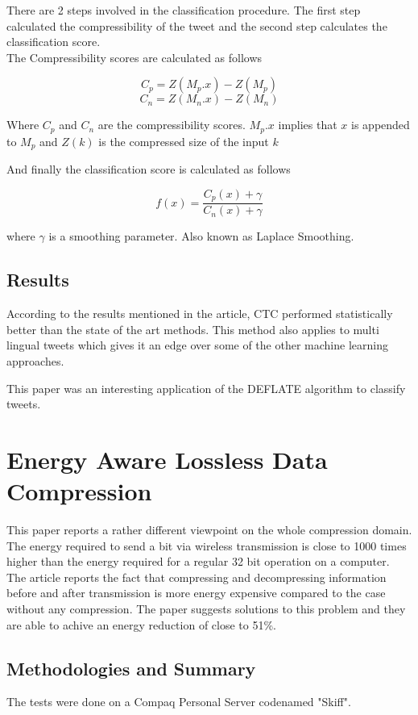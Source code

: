 \documentclass{article}
\begin{document}
There are 2 steps involved in the classification procedure. The first step calculated the compressibility of the tweet and the second step calculates the classification score. \\ 

The Compressibility scores are calculated as follows  \cite{10.1145/2064448.2064473}

$$C_p = Z(M_p . x) - Z(M_p)$$
$$C_n = Z(M_n . x) - Z(M_n)$$

Where $C_p$ and $C_n$ are the compressibility scores. $M_p . x$ implies that $x$ is appended to $M_p$ and $Z(k)$ is the compressed size of the input $k$ 

And finally the classification score is calculated as follows

$$
f(x) = \frac{C_p(x) + \gamma}{C_n(x) + \gamma}
$$

where $\gamma$ is a smoothing parameter. Also known as Laplace Smoothing. 

\subsection{Results}

According to the results mentioned in the article, CTC performed statistically better than the state of the art methods. This method also applies to multi lingual tweets which gives it an edge over some of the other machine learning approaches.

This paper was an interesting application of the DEFLATE algorithm to classify tweets.


\section{Energy Aware Lossless Data Compression \cite{10.1145/1151690.1151692}}

This paper reports a rather different viewpoint on the whole compression domain. The energy required to send a bit via wireless transmission is close to 1000 times higher than the energy required for a regular 32 bit operation on a computer. The article reports the fact that compressing and decompressing information before and after transmission is more energy expensive compared to the case without any compression. The paper suggests solutions to this problem and they are able to achive an energy reduction of close to 51\%.

\subsection{Methodologies and Summary}
The tests were done on a Compaq Personal Server codenamed "Skiff". 
\end{document}
